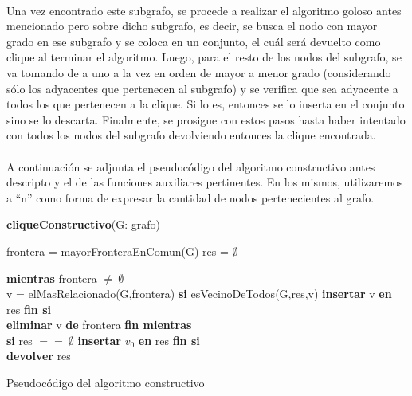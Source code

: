 \paragraph{}
Una vez encontrado este subgrafo, se procede a realizar el algoritmo goloso antes mencionado pero sobre dicho subgrafo, es decir, se busca el nodo con mayor grado en ese subgrafo y se coloca en un conjunto, el cuál será devuelto como clique al terminar el algoritmo. Luego, para el resto de los nodos del subgrafo, se va tomando de a uno a la vez en orden de mayor a menor grado (considerando sólo los adyacentes que pertenecen al subgrafo) y se verifica que sea adyacente a todos los que pertenecen a la clique. Si lo es, entonces se lo inserta en el conjunto sino se lo descarta. Finalmente, se prosigue con estos pasos hasta haber intentado con todos los nodos del subgrafo devolviendo entonces la clique encontrada.

\paragraph{}
A continuación se adjunta el pseudocódigo del algoritmo constructivo antes descripto y el de las funciones auxiliares pertinentes. En los mismos, utilizaremos a ``n'' como forma de expresar la cantidad de nodos pertenecientes al grafo.

\vspace{2em}
\incmargin{3em}
\linesnumbered
{}
\footnotesize 
\textbf{cliqueConstructivo}(G: grafo) \\
\begin{algorithm}[H]
	\BlankLine
	frontera = mayorFronteraEnComun(G) 
	res = $\emptyset$
	\BlankLine

	\textbf{mientras} frontera $\neq\ \emptyset$\\

		\tab v = elMasRelacionado(G,frontera)
		\tab \textbf{si} esVecinoDeTodos(G,res,v)
			\tab \tab \textbf{insertar} v \textbf{en} res
		\tab \textbf{fin si}\\
		\tab \textbf{eliminar} v \textbf{de} frontera
	\textbf{fin mientras}\\

	\textbf{si} res $==\ \emptyset$
		\tab \textbf{insertar} $v_0$ \textbf{en} res
	\textbf{fin si}\\

	\textbf{devolver} res
\caption{Pseudocódigo del algoritmo constructivo}
\end{algorithm}

